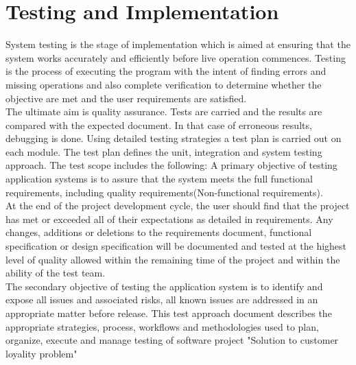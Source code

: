\chapter{Testing and Implementation}
\par
System testing is the stage of implementation which is aimed at ensuring that
the system works accurately and efficiently before live operation commences.
Testing is the process of executing the program with the intent of finding
errors and missing operations and also complete verification to determine
whether the objective are met and the user requirements are satisfied.\\

The ultimate aim is quality assurance. Tests are carried and the results are
compared with the expected document. In that case of erroneous results, debugging
is done. Using detailed testing strategies a test plan is carried out on each
module. The test plan defines the unit, integration and system testing approach.
The test scope includes the following: A primary objective of testing
application systems is to assure that the system meets the full functional
requirements, including quality requirements(Non-functional requirements).\\

At the end of the project development cycle, the user should find that the
project has met or exceeded all of their expectations as detailed in
requirements. Any changes, additions or deletions to the requirements document,
functional specification or design specification will be documented and tested
at the highest level of quality allowed within the remaining time of the
project and within the ability of the test team.\\

The secondary objective of testing the application system is to identify and
expose all issues and associated risks, all known issues are
addressed in an appropriate matter before release. This test approach document
describes the appropriate strategies, process, workflows and methodologies
used to plan, organize, execute and manage testing of software project
"Solution to customer loyality problem"

\newpage


